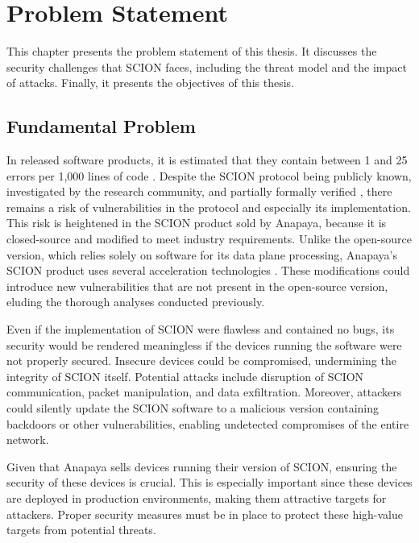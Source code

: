 \chapter{Problem Statement}
\label{ch:problem}

This chapter presents the problem statement of this thesis.
It discusses the security challenges that SCION faces, including the threat model and the impact of attacks.
Finally, it presents the objectives of this thesis.

\section{Fundamental Problem}
\label{sec:fundamental-problem}
In released software products, it is estimated that they contain between 1 and 25 errors per 1,000 lines of code \cite{McConnell2004}.
Despite the SCION protocol being publicly known, investigated by the research community, and partially formally verified \cite[Chapters 7, 22, and 23]{Perrig2022}, there remains a risk of vulnerabilities in the protocol and especially its implementation.
This risk is heightened in the SCION product sold by Anapaya, because it is closed-source and modified to meet industry requirements.
Unlike the open-source version, which relies solely on software for its data plane processing, Anapaya's SCION product uses several acceleration technologies \cite{anapayaPerformanceOptimizations}.
These modifications could introduce new vulnerabilities that are not present in the open-source version, eluding the thorough analyses conducted previously.

Even if the implementation of SCION were flawless and contained no bugs, its security would be rendered meaningless if the devices running the software were not properly secured.
Insecure devices could be compromised, undermining the integrity of SCION itself.
Potential attacks include disruption of SCION communication, packet manipulation, and data exfiltration.
Moreover, attackers could silently update the SCION software to a malicious version containing backdoors or other vulnerabilities, enabling undetected compromises of the entire network.

Given that Anapaya sells devices running their version of SCION, ensuring the security of these devices is crucial.
This is especially important since these devices are deployed in production environments, making them attractive targets for attackers.
Proper security measures must be in place to protect these high-value targets from potential threats.



